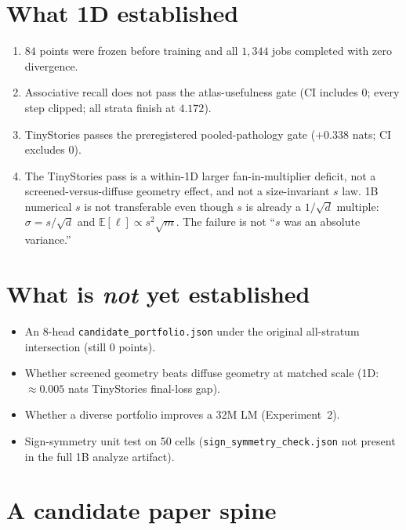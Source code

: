 \documentclass[11pt,a4paper]{report}
\begin{document}
\section{What 1D established}

\begin{enumerate}[leftmargin=*]
  \item $84$ points were frozen before training and all $1{,}344$ jobs completed with zero divergence.
  \item Associative recall does not pass the atlas-usefulness gate (CI includes $0$; every step clipped; all strata finish at $4.172$).
  \item TinyStories passes the preregistered pooled-pathology gate ($+0.338$ nats; CI excludes $0$).
  \item The TinyStories pass is a within-1D larger fan-in-multiplier deficit, not a screened-versus-diffuse geometry effect, and not a size-invariant $s$ law. 1B numerical $s$ is not transferable even though $s$ is already a $1/\sqrt{d}$ multiple: $\sigma=s/\sqrt{d}$ and $\mathbb{E}[\ell]\propto s^2\sqrt{m}$. The failure is not ``$s$ was an absolute variance.''
\end{enumerate}

\section{What is \emph{not} yet established}

\begin{itemize}[leftmargin=*]
  \item An 8-head \texttt{candidate\_portfolio.json} under the original all-stratum intersection (still $0$ points).
  \item Whether screened geometry beats diffuse geometry at matched scale (1D: $\approx 0.005$ nats TinyStories final-loss gap).
  \item Whether a diverse portfolio improves a 32M LM (Experiment~2).
  \item Sign-symmetry unit test on 50 cells (\texttt{sign\_symmetry\_check.json} not present in the full 1B analyze artifact).
\end{itemize}

\section{A candidate paper spine}
\end{document}

